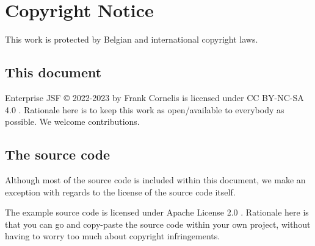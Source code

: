 %

\chapter*{Copyright Notice}
This work is protected by Belgian and international copyright laws.

\section*{This document}
Enterprise JSF © 2022-2023 by Frank Cornelis is licensed under CC BY-NC-SA 4.0 \cite{CCLicense}.
Rationale here is to keep this work as open/available to everybody as possible.
We welcome contributions.

\section*{The source code}
Although most of the source code is included within this document,
we make an exception with regards to the license of the source code itself.

The example source code is licensed under Apache License 2.0 \cite{ApacheLicense}.
Rationale here is that you can go and copy-paste the source code within your own project,
without having to worry too much about copyright infringements.
